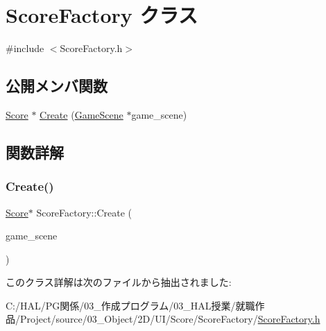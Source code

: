 \hypertarget{class_score_factory}{}\section{Score\+Factory クラス}
\label{class_score_factory}


{\ttfamily \#include $<$Score\+Factory.\+h$>$}

\subsection*{公開メンバ関数}
\begin{DoxyCompactItemize}
\item 
\mbox{\hyperlink{class_score}{Score}} $\ast$ \mbox{\hyperlink{class_score_factory_a1c3047d657151d5bbda8157a743b154d}{Create}} (\mbox{\hyperlink{class_game_scene}{Game\+Scene}} $\ast$game\+\_\+scene)
\end{DoxyCompactItemize}


\subsection{関数詳解}
\mbox{\label{class_score_factory_a1c3047d657151d5bbda8157a743b154d}} 
\subsubsection{\texorpdfstring{Create()}{Create()}}
{\footnotesize\ttfamily \mbox{\hyperlink{class_score}{Score}}$\ast$ Score\+Factory\+::\+Create (\begin{DoxyParamCaption}\item[{\mbox{\hyperlink{class_game_scene}{Game\+Scene}} $\ast$}]{game\+\_\+scene }\end{DoxyParamCaption})\hspace{0.3cm}{\ttfamily [inline]}}



このクラス詳解は次のファイルから抽出されました\+:\begin{DoxyCompactItemize}
\item 
C\+:/\+H\+A\+L/\+P\+G関係/03\+\_\+作成プログラム/03\+\_\+\+H\+A\+L授業/就職作品/\+Project/source/03\+\_\+\+Object/2\+D/\+U\+I/\+Score/\+Score\+Factory/\mbox{\hyperlink{_score_factory_8h}{Score\+Factory.\+h}}\end{DoxyCompactItemize}
